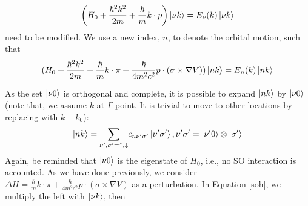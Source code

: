 \documentclass{article}
\begin{document}
\begin{equation}
    \left( H_0 + \frac{\hbar^2 k^2}{2 m} + \frac{\hbar}{m} k \cdot p \right) \ket{\nu k} = E_{\nu} (k) \ket{\nu k}
\end{equation}
need to be modified. We use a new index, $n$, to denote the orbital motion, such that
\begin{equation}
    (H_0 + \frac{\hbar^2 k^2}{2 m} + \frac{\hbar}{m} k \cdot \pi + \frac{\hbar}{4 m^2 c^2} p \cdot (\sigma \times \nabla V))\ket{nk}=E_n(k)\ket{nk}
\label{soh}
\end{equation}

As the set $\ket{\nu 0}$ is orthogonal and complete, it is possible to expand $\ket{nk}$ by $\ket{\nu 0}$ (note that, we assume $k$ at $\Gamma$ point. It is trivial to move to other locations by replacing with $k-k_0$):
\begin{equation}
    \ket{n k} = \underset{\nu', \sigma' = \uparrow, \downarrow}{\sum} c_{n \nu'\sigma'} \ket{\nu' \sigma'}, \nu' \sigma' = \ket{\nu' 0} \otimes \ket{ \sigma'}
\end{equation}
Again, be reminded that $\ket{\nu 0}$ is the eigenstate of $H_0$, i.e., no SO interaction is accounted. As we have done previously, we consider $\Delta H = \frac{\hbar}{m} k \cdot \pi + \frac{\hbar}{4 m^2 c^2} p \cdot (\sigma \times \nabla V)$ as a perturbation. In Equation \ref{soh}, we multiply the left with $\ket{\nu k}$, then
\end{document}
